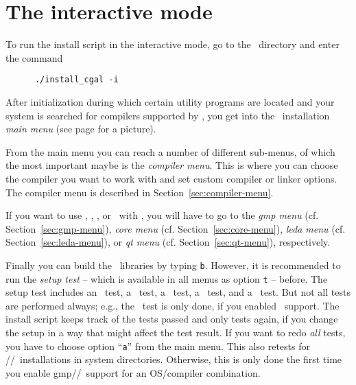 

\section{The interactive mode}\label{sec:interactive-mode}

To run the install script in the interactive mode, go to the \cgaldir\ 
directory and enter the command
\begin{verbatim}
      ./install_cgal -i
\end{verbatim}

After initialization during which certain utility programs are located
and your system is searched for compilers supported by \cgal, you get
into the \cgal\ installation \textit{main menu} (see page
\pageref{pic:main-menu} for a picture).

From the main menu you can reach a number of different sub-menus, of
which the most important maybe is the \textit{compiler menu}. This is
where you can choose the compiler you want to work with and set custom
compiler or linker options. The compiler menu is described in
Section~\ref{sec:compiler-menu}.

If you want to use \gmp, \core, \leda, or \qt\ with \cgal, you will
have to go to the \textit{gmp menu} (cf. Section~\ref{sec:gmp-menu}),
\textit{core menu} (cf. Section~\ref{sec:core-menu}), \textit{leda
  menu} (cf. Section~\ref{sec:leda-menu}), or \textit{qt menu} (cf.
Section~\ref{sec:qt-menu}), respectively.

Finally you can build the \cgal\ libraries by typing \texttt{b}.
However, it is recommended to run the \textit{setup test} -- which is
available in all menus as option \texttt{t} -- before. The setup test
includes an \stl\ test, a \gmp\ test, a \core\ test, a \leda\ test,
and a \qt\ test.  But not all tests are performed always; e.g., the
\gmp\ test is only done, if you enabled \gmp\ support. The install
script keeps track of the tests passed and only tests again, if you
change the setup in a way that might affect the test result. If you
want to redo \textit{all} tests, you have to choose option
``\texttt{a}'' from the main menu.  This also retests for
\gmp/\leda/\qt\ installations in system directories. Otherwise, this
is only done the first time you enable gmp/\leda/\qt\ support for an
OS/compiler combination.

